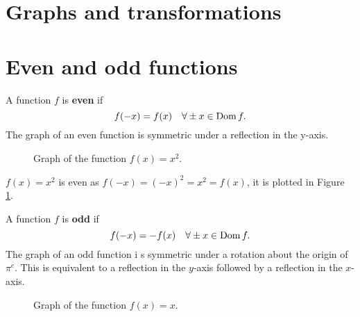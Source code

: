 \section{Graphs and transformations}


\section{Even and odd functions}

\begin{definition}
    A function $f$ is \textbf{even} if
    \[f(-x)=f(x)\quad\forall\pm x\in\operatorname{Dom} f.\]
    The graph of an even function is symmetric under a reflection in the y-axis. 
\end{definition}

\begin{figure}
    \centering
    \caption{Graph of the function $f(x)=x^2$.}
    \label{fig:x_squared_graph}
\end{figure}
    
\begin{example}
    $f(x)=x^2$ is even as $f(-x)=(-x)^2=x^2=f(x)$, it is plotted in Figure \ref{fig:x_squared_graph}.
\end{example}

\begin{definition}
    A function $f$ is \textbf{odd} if
    \[f(-x)=-f(x)\quad\forall\pm x\in\operatorname{Dom} f.\]
    The graph of an odd function i s symmetric under a rotation about the origin of $\pi^c$. This is equivalent to a reflection in the $y$-axis followed by a reflection in the $x$-axis.
\end{definition}

\begin{figure}
    \centering
    \caption{Graph of the function $f(x)=x$.}
    \label{fig:x_graph}
\end{figure}


